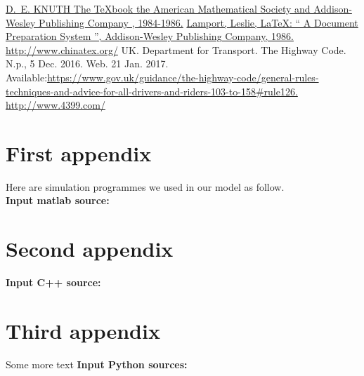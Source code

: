 \documentclass{mcmthesis}
\begin{document}
\begin{thebibliography}{99}
 \href{https://wenku.baidu.com/view/025f88e1b8f67c1cfad6b8bb.html}{D.~E. KNUTH   The \TeX{}book  the American
Mathematical Society and Addison-Wesley
Publishing Company , 1984-1986.}
\href{https://openknowledge.worldbank.org/handle/10986/2959}{Lamport, Leslie,  \LaTeX{}: `` A Document Preparation System '',
Addison-Wesley Publishing Company, 1986.}
\url{http://www.chinatex.org/}
 UK. Department for Transport. The Highway Code. N.p., 5 Dec. 2016. Web. 21 Jan. 2017. Available:\quad\href{ https://www.gov.uk/guidance/the-highway-code/general-rules-techniques-and-advice-for-all-drivers-and-riders-103-to-158#rule126}{https://www.gov.uk/guidance/the-highway-code/general-rules-techniques-and-advice-for-all-drivers-and-riders-103-to-158\#rule126.}
\url{http://www.4399.com/}
\end{thebibliography}


\begin{appendices}

\section{First appendix}
\lipsum[4]

Here are simulation programmes we used in our model as follow.\\

\textbf{\textcolor[rgb]{0.98, 0.00, 0.00}{Input matlab source:}}


\section{Second appendix}
\quad\quad \textcolor[rgb]{0.98, 0.00, 0.00}{\textbf{Input C++ source:}}


\section{Third appendix}
Some more text \textcolor[rgb]{0.98, 0.00, 0.00}{\textbf{Input Python sources:}}


\end{appendices}

\end{document}
